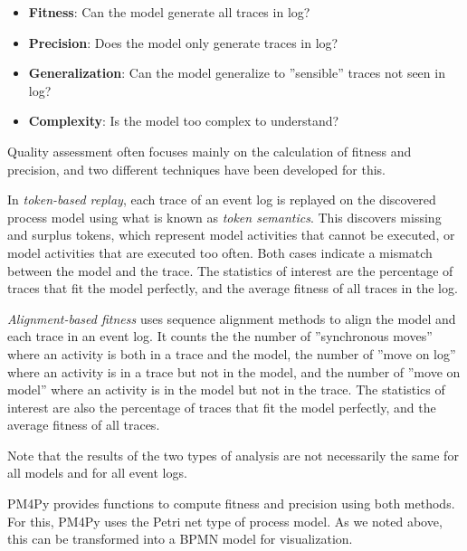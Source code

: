 \begin{itemize}
   \item \textbf{Fitness}: Can the model generate all traces in log?
   \item \textbf{Precision}: Does the model only generate traces in log?
   \item \textbf{Generalization}: Can the model generalize to ''sensible'' traces not seen in log?
   \item \textbf{Complexity}: Is the model too complex to understand?
\end{itemize}

Quality assessment often focuses mainly on the calculation of fitness and precision, and two different techniques have been developed for this.

In \emph{token-based replay}, each trace of an event log is replayed on the discovered process model using what is known as \emph{token semantics}. This discovers missing and surplus tokens, which represent model activities that cannot be executed, or model activities that are executed too often. Both cases indicate a mismatch between the model and the trace. The statistics of interest are the percentage of traces that fit the model perfectly, and the average fitness of all traces in the log.

\emph{Alignment-based fitness} uses sequence alignment methods to align the model and each trace in an event log. It counts the the number of ''synchronous moves'' where an activity is both in a trace and the model, the number of ''move on log'' where an activity is in a trace but not in the model, and the number of ''move on model'' where an activity is in the model but not in the trace. The statistics of interest are also the percentage of traces that fit the model perfectly, and the average fitness of all traces.

Note that the results of the two types of analysis are not necessarily the same for all models and for all event logs.

PM4Py provides functions to compute fitness and precision using both methods. For this, PM4Py uses the Petri net type of process model. As we noted above, this can be transformed into a BPMN model for visualization. 

